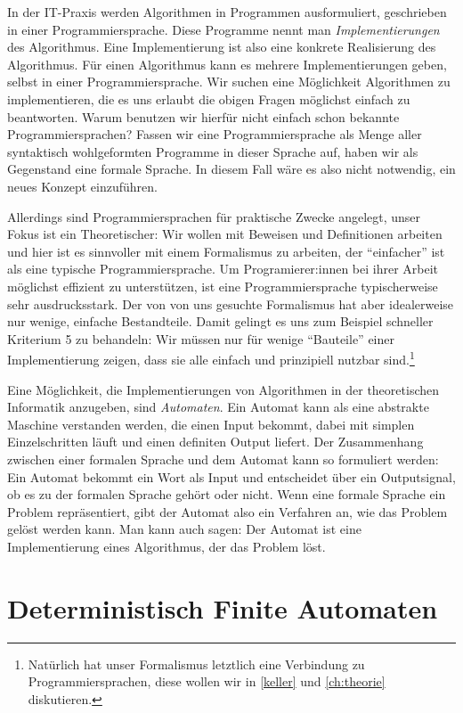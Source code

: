 In der IT-Praxis werden Algorithmen in Programmen ausformuliert,
geschrieben in einer Programmiersprache.
Diese Programme nennt man \emph{Implementierungen} des Algorithmus.
Eine Implementierung ist also eine konkrete Realisierung des Algorithmus.
Für einen Algorithmus kann es mehrere Implementierungen geben,
selbst in einer Programmiersprache.
Wir suchen eine Möglichkeit Algorithmen zu implementieren,
die es uns erlaubt die obigen Fragen möglichst einfach zu beantworten.
Warum benutzen wir hierfür nicht einfach schon bekannte Programmiersprachen?
Fassen wir eine Programmiersprache als
Menge aller syntaktisch wohlgeformten Programme in dieser Sprache auf, 
haben wir als Gegenstand eine formale Sprache.
In diesem Fall wäre es also nicht notwendig,
ein neues Konzept einzuführen.

Allerdings sind Programmiersprachen für praktische Zwecke angelegt,
unser Fokus ist ein Theoretischer:
Wir wollen mit Beweisen und Definitionen arbeiten
und hier ist es sinnvoller mit einem Formalismus zu arbeiten,
der ``einfacher'' ist als eine typische Programmiersprache.
Um Programierer:innen bei ihrer Arbeit möglichst effizient zu unterstützen,
ist eine Programmiersprache typischerweise sehr ausdrucksstark.
Der von von uns gesuchte Formalismus hat aber idealerweise nur wenige, einfache Bestandteile.
Damit gelingt es uns zum Beispiel schneller Kriterium 5 zu behandeln:
Wir müssen nur für wenige ``Bauteile'' einer Implementierung zeigen,
dass sie alle einfach und prinzipiell nutzbar sind.\footnote{
    Natürlich hat unser Formalismus letztlich eine Verbindung zu Programmiersprachen,
    diese wollen wir in \autoref{keller} und \autoref{ch:theorie} diskutieren.
}

Eine Möglichkeit,
die Implementierungen von Algorithmen in der theoretischen Informatik
anzugeben, sind \emph{Automaten}.
Ein Automat kann als eine abstrakte Maschine verstanden werden,
die einen Input bekommt, 
dabei mit simplen Einzelschritten läuft
und einen definiten Output liefert.
Der Zusammenhang zwischen einer formalen Sprache und dem Automat kann so formuliert werden:
Ein Automat bekommt ein Wort als Input und entscheidet über ein Outputsignal,
ob es zu der formalen Sprache gehört oder nicht.
Wenn eine formale Sprache ein Problem repräsentiert,
gibt der Automat also ein Verfahren an, 
wie das Problem gelöst werden kann.
Man kann auch sagen:
Der Automat ist eine Implementierung eines Algorithmus,
der das Problem löst.

\section{Deterministisch Finite Automaten}

